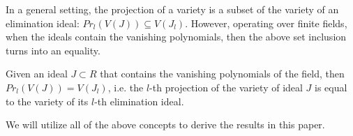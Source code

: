 In a general setting, the projection of a variety is a subset of the
variety of an elimination ideal: $Pr_l(V(J)) \subseteq V(J_l)$. However,
operating over finite fields, when the ideals contain the vanishing
polynomials, then the above set inclusion turns into an equality.


\begin{Lemma}
\label{lemma:project}
Given an ideal $J \subset R$ that contains the vanishing polynomials of 
the field, then $Pr_l(V(J)) = V(J_l)$, 
i.e. the $l$-th projection of the variety of ideal $J$ is equal to 
the variety of its $l$-th elimination ideal.

\end{Lemma}



We will utilize all of the above concepts to derive the results in
this paper. 
